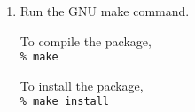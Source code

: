 \begin{enumerate}
 \item Run the GNU make command.

   To compile the package,\\
       \texttt{\% make}
       
   To install the package,\\
       \texttt{\% make install}

\end{enumerate}
